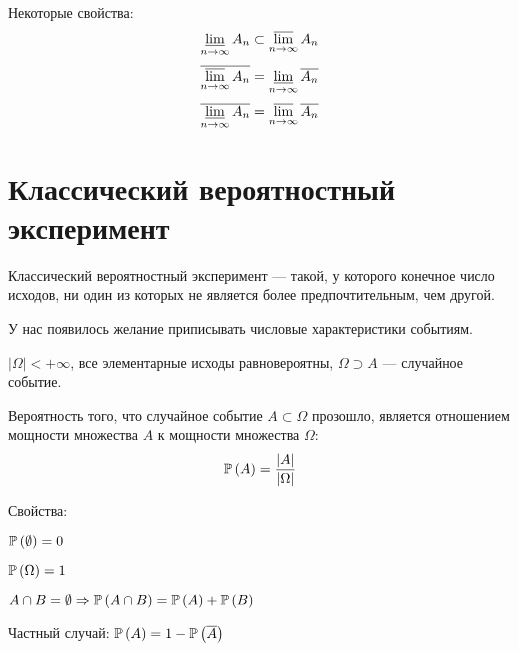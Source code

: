 Некоторые свойства:
$$\varliminf_{n \to \infty} A_n \subset \varlimsup_{n \to \infty} A_n $$
$$\overline{\varlimsup_{n \to \infty} A_n} = \varliminf_{n \to \infty} \overline{A_n}$$
$$\overline{\varliminf_{n \to \infty} A_n} = \varlimsup_{n \to \infty} \overline{A_n} $$

\section{Классический вероятностный эксперимент}
\begin{definition}
Классический вероятностный эксперимент --- такой, у которого конечное число исходов, ни один из которых не является более предпочтительным, чем другой.
\end{definition}

У нас появилось желание приписывать числовые характеристики событиям.

$\left|\Omega\right| < +\infty$, все элементарные исходы равновероятны, $\Omega \supset A$ --- случайное событие.
\begin{definition}[Вероятность]
Вероятность того, что случайное событие $A\subset\Omega$ прозошло, является отношением мощности множества $A$ к мощности множества $\Omega$:
$$\mathbb{P}\left( A \right)=\frac{\left|A\right|}{\left|\Omega\right|}$$

Свойства:

$\mathbb{P}\left( \emptyset \right)=0$

$\mathbb{P}\left( \Omega \right)=1$

$A\cap B=\emptyset \Rightarrow \mathbb{P}\left( A\cap B \right)=\mathbb{P}\left( A \right)+\mathbb{P}\left( B \right)$

Частный случай:
$\mathbb{P}\left( A \right)=1-\mathbb{P}\left( \overline{A} \right)$
\end{definition}

